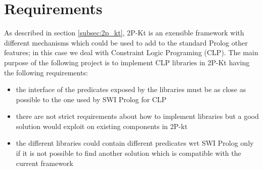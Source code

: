 \section{Requirements}\label{sec:Requirements}

As described in section \ref{subsec:2p_kt}, 2P-Kt is an exensible framework with different mechanisms
which could be used to add to the standard Prolog other features; in this case we deal with Constraint Logic Programing (CLP).\newline
The main purpose of the following project is to implement CLP libraries in 2P-Kt having the following requirements:
\begin{itemize}
    \item the interface of the predicates exposed by the libraries must be as close as possible to the one used by SWI Prolog for CLP
    \item there are not strict requirements about how to implement libraries but a good solution would exploit on existing components in 2P-kt
    \item the different libraries could contain different predicates wrt SWI Prolog only if it is not possible to find another solution which is compatible with the current framework
\end{itemize}


